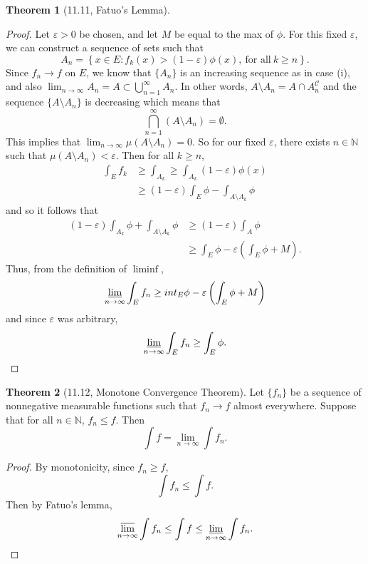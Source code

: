 \documentclass[12pt]{article}
\newcommand{\N}{\mathbb{N}}
\newcommand{\C}{\mathscr{C}}
\renewcommand{\epsilon}{\varepsilon}
\theoremstyle{definition}
\newtheorem*{thm}{Theorem}
\begin{document}
\begin{thm}[11.11, Fatuo's Lemma]
\begin{proof}
          Let \( \epsilon > 0 \) be chosen, and let \( M \) be equal to the max of \( \phi \).
          For this fixed \( \epsilon \), we can construct a sequence of sets such that 
            \[
                A_n = \left\{  x \in E : f_k(x) > (1 - \epsilon) \phi(x), \ \text{for all} \ k \geq n \right\}.
            \]
          Since \( f_n \to f \) on \(E \), we know that \( \{A_n\} \) is an increasing sequence as in case (i), and also \( \displaystyle \lim_{n \to \infty} A_n = A \subset \bigcup_{n=1}^{\infty} A_n \).
          In other words, \( A \setminus A_n = A \cap A_n^{\C} \) and the sequence \( \{ A \setminus A_n\} \) is decreasing which means that 
            \[
                \bigcap_{n=1}^{\infty} \left( A \setminus A_n \right) = \emptyset.
            \]
          This implies that \( \displaystyle \lim_{n \to \infty} \mu(A \setminus A_n) = 0 \). 
          So for our fixed \( \epsilon \), there exists \( n \in \N \) such that \( \mu(A \setminus A_n) < \epsilon \).
          Then for all \( k \geq n \),
            \begin{align*}
              \int_{E} f_k &\geq \int_{A_k} \geq \int_{A_{k}} (1 - \epsilon) \phi(x) \\
              &\geq (1 - \epsilon) \int_{E} \phi - \int_{A \setminus A_{k}} \phi 
            \end{align*}
          and so it follows that 
            \begin{align*}
              (1- \epsilon) \int_{A_{k}} \phi + \int_{A \setminus A_{k}} \phi  
              &\geq (1 - \epsilon) \int_{A} \phi \\
              &\geq \int_{E} \phi - \epsilon \left( \int_{E} \phi + M \right).
            \end{align*}
          Thus, from the definition of \( \liminf \),
            \[
                \varliminf_{n \to \infty} \int_{E} f_n \geq int_{E} \phi - \epsilon \left( \int_{E} \phi + M \right)
            \]
          and since \( \epsilon \) was arbitrary,
            \[ \varliminf_{n \to \infty} \int_{E} f_n \geq \int_{E} \phi. \]
        \end{proof}

\end{thm}

\begin{thm}[11.12, Monotone Convergence Theorem]

  Let \( \{f_n\} \) be a sequence of nonnegative measurable functions such that \( f_n \to f \) almost everywhere.
  Suppose that for all \( n \in \N \), \( f_n \leq f \).
  Then
    \[
        \int f = \lim_{n \to \infty} \int f_n.
    \]  
      \begin{proof}
        By monotonicity, since \( f_n \geq f \),
          \[
              \int f_n \leq \int f.
          \]
        Then by Fatuo's lemma,
          \[
              \varlimsup_{n \to \infty} \int f_n \leq \int f \leq \varliminf_{n \to \infty} \int f_n.
          \]
      \end{proof}
\end{thm}
\end{document}
